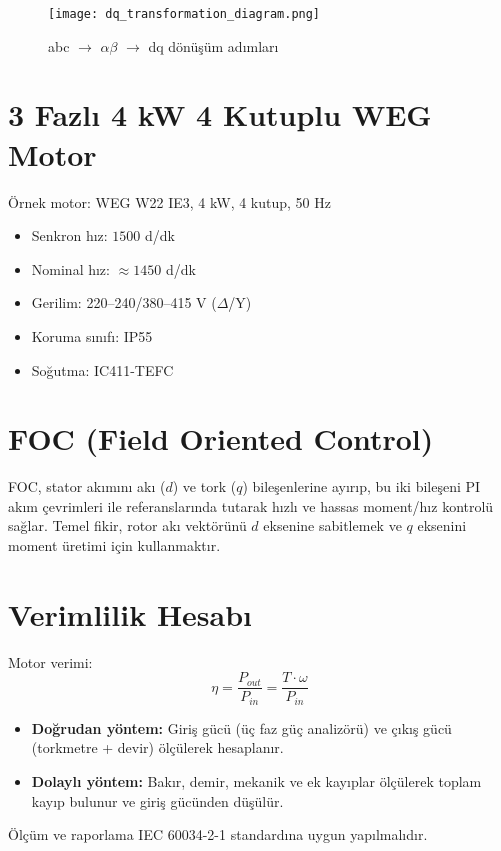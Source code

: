 \begin{figure}[H]
    \centering
    \texttt{[image: dq\_transformation\_diagram.png]}
    \caption{abc $\rightarrow$ $\alpha\beta$ $\rightarrow$ dq dönüşüm adımları}
    \label{fig:dq_transformation}
\end{figure}


\section{3 Fazlı 4 kW 4 Kutuplu WEG Motor} Örnek motor: WEG W22 IE3, 4 kW, 4 kutup, 50 Hz \begin{itemize} \item Senkron hız: $1500$ d/dk \item Nominal hız: $\approx 1450$ d/dk \item Gerilim: 220–240/380–415 V ($\Delta$/Y) \item Koruma sınıfı: IP55 \item Soğutma: IC411-TEFC \end{itemize} 

\section{FOC (Field Oriented Control)} FOC, stator akımını akı ($d$) ve tork ($q$) bileşenlerine ayırıp, bu iki bileşeni PI akım çevrimleri ile referanslarında tutarak hızlı ve hassas moment/hız kontrolü sağlar. Temel fikir, rotor akı vektörünü $d$ eksenine sabitlemek ve $q$ eksenini moment üretimi için kullanmaktır. 

\section{Verimlilik Hesabı} Motor verimi: \begin{equation} \eta = \frac{P_{out}}{P_{in}} = \frac{T \cdot \omega}{P_{in}} \end{equation} \begin{itemize} \item \textbf{Doğrudan yöntem:} Giriş gücü (üç faz güç analizörü) ve çıkış gücü (torkmetre + devir) ölçülerek hesaplanır. \item \textbf{Dolaylı yöntem:} Bakır, demir, mekanik ve ek kayıplar ölçülerek toplam kayıp bulunur ve giriş gücünden düşülür. \end{itemize} Ölçüm ve raporlama IEC 60034-2-1 standardına uygun yapılmalıdır.
 
\medskip




\clearpage

